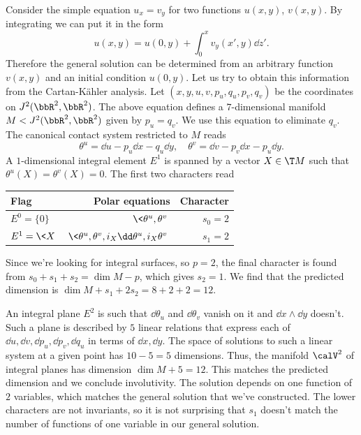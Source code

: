 \begin{example}\label{ex ux=vy 1}
    Consider the simple equation $u_x=v_y$ for two functions $u(x,y)$, $v(x,y)$. By integrating we can put it in the form 
    \[u(x,y)=u(0,y)+\int_0^x v_y(x',y)\dd z'.\]
    Therefore the general solution can be determined from an arbitrary function $v(x,y)$ and an initial condition $u(0,y)$. Let us try to obtain this information from the Cartan-K\"ahler analysis. Let $(x,y,u,v,p_u,q_u,p_v,q_v)$ be the coordinates on $J^2(\bbR^2,\bbR^2)$. The above equation defines a $7$-dimensional manifold $M<J^2(\bbR^2,\bbR^2)$ given by $p_u=q_v$. We use this equation to eliminate $q_v$. The canonical contact system restricted to $M$ reads 
    \[\theta^u=\dd u-p_u\dd x-q_u\dd y,\quad \theta^v=\dd v-p_v\dd x-p_u\dd y.\]
    A $1$-dimensional integral element $E^1$ is spanned by a vector $X\in \T M$ such that $\theta^u(X)=\theta^v(X)=0$. The first two characters read 
    \begin{center}
        \begin{tabular}{l r r} 
         Flag & Polar equations & Character \\ [0.5ex] 
         \hline
         $E^0=\{0\}$ & $\<\theta^u,\theta^v\>$ & $s_0=2$ \\ 
         $E^1=\<X\>$ & $\<\theta^u,\theta^v,i_X\dd\theta^u,i_X\theta^v\>$ & $s_1=2$ \\
         \hline
        \end{tabular}
    \end{center}
    Since we're looking for integral surfaces, so $p=2$, the final character is found from $s_0+s_1+s_2=\dim M-p$, which gives $s_2=1$.
    We find that the predicted dimension is $\dim M+s_1+2s_2=8+2+2=12$. 

    An integral plane $E^2$ is such that $\dd\theta_u$ and $\dd\theta_v$ vanish on it and $\dd x\wedge\dd y$ doesn't. Such a plane is described by $5$ linear relations that express each of $\dd u,\dd v,\dd p_u,\dd p_v,\dd q_u$ in terms of $\dd x,\dd y$. The space of solutions to such a linear system at a given point has $10-5=5$ dimensions. Thus, the manifold $\calV^2$ of integral planes has dimension $\dim M+5=12$. This matches the predicted dimension and we conclude involutivity. The solution depends on one function of $2$ variables, which matches the general solution that we've constructed. The lower characters are not invariants, so it is not surprising that $s_1$ doesn't match the number of functions of one variable in our general solution.
\end{example}

